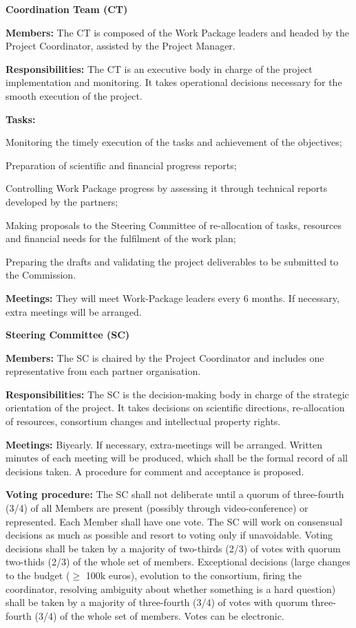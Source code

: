 \begin{description}
\item{\textbf{Coordination Team (CT)}} \nobreak\par
\textbf{Members:} The CT is composed of the Work Package leaders
and headed by the Project Coordinator, assisted by the Project
Manager.

\textbf{Responsibilities:} The CT is an executive body in charge of
the project implementation and monitoring.
It takes operational decisions necessary for the smooth execution of
the project.

\textbf{Tasks:}
\begin{compactenum}
\item Monitoring the timely execution of the tasks and achievement of
  the objectives;
\item Preparation of scientific and financial progress reports;
\item Controlling Work Package progress by assessing it through technical
  reports developed by the partners;
\item Making proposals to the Steering Committee of re-allocation of
  tasks, resources and financial needs for the fulfilment of the work
  plan;
\item Preparing the drafts and validating the project deliverables to
  be submitted to the Commission.
\end{compactenum}

\textbf{Meetings:} They will meet Work-Package leaders every 6 months.
If necessary, extra meetings will be arranged.

\item{\textbf{Steering Committee (SC)}}\nobreak\par

\textbf{Members:} The SC is chaired by the Project Coordinator
and includes one representative from each partner organisation.

\textbf{Responsibilities:} The SC is the decision-making body in
charge of the strategic orientation of the project.  It takes decisions on scientific
directions, re-allocation of resources, consortium
changes and intellectual property rights.

\textbf{Meetings:} Biyearly. If necessary, extra-meetings
will be arranged.  Written minutes of each meeting will be produced,
which shall be the formal record of all decisions taken. A procedure
for comment and acceptance is proposed.

\textbf{Voting procedure:} The SC shall not deliberate until a quorum
of three-fourth (3/4) of all Members are present (possibly through
video-conference) or represented. Each Member shall have one vote. The
SC will work on consensual decisions as much as possible and resort to
voting only if unavoidable. Voting decisions shall be taken by a
majority of two-thirds (2/3) of votes with quorum two-thids (2/3) of
the whole set of members. Exceptional decisions (large changes to the
budget ($\geq$ 100k euros), evolution to the consortium, firing the
coordinator, resolving ambiguity about whether something is a hard
question) shall be taken by a majority of three-fourth (3/4) of votes
with quorum three-fourth (3/4) of the whole set of members. Votes can
be electronic.


\end{description}
